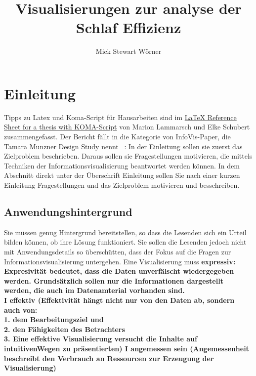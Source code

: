\documentclass[usegeometry=true]{scrartcl}
\begin{document}
\subject{Projektbericht zum Modul Information Retrieval und Visualisierung Sommersemester 2023}
\title{Visualisierungen zur analyse der Schlaf Effizienz}
\author{Mick Stewart Wörner}%
\maketitle%

\section{Einleitung}
Tipps zu Latex und Koma-Script für Hausarbeiten sind im \href{http://mirrors.ctan.org/info/latex-refsheet/LaTeX_RefSheet.pdf}{LaTeX Reference Sheet for a thesis with KOMA-Script} von Marion Lammarsch und Elke Schubert zusammengefasst. 
Der Bericht fällt in die Kategorie von InfoVis-Paper, die Tamara Munzner Design Study nennt ~\cite{Munzner2008}: In der Einleitung sollen sie zuerst das Zielproblem beschrieben. Daraus sollen sie Fragestellungen motivieren, die mittels Techniken der Informationsvisualisierung beantwortet werden können. In dem Abschnitt direkt unter der Überschrift Einleitung sollen Sie nach einer kurzen Einleitung Fragestellungen und das Zielproblem motivieren und besschreiben. 

\subsection{Anwendungshintergrund}
Sie müssen genug Hintergrund bereitstellen, so dass die Lesenden sich ein Urteil bilden können, ob ihre Lösung funktioniert. 
Sie sollen die Lesenden jedoch nicht mit Anwendungsdetails so überschütten, dass der Fokus auf die Fragen zur Informationsvisualisierung untergehen. 
Eine Visualisierung muss 
\textbf{expressiv: Expresivität bedeutet, dass die Daten unverfälscht wiedergegeben werden. Grundsätzlich sollen nur die Informationen dargestellt werden, die auch im Datenamterial vorhanden sind.\\
I effektiv (Effektivität hängt nicht nur von den Daten ab, sondern auch von:\\ 1. dem Bearbeitungsziel und \\2. den Fähigkeiten des Betrachters \\
3. Eine effektive Visualisierung versucht die Inhalte auf intuitivenWegen zu präsentierten)
I angemessen sein (Angemessenheit beschreibt den Verbrauch an Ressourcen zur Erzeugung der Visualisierung)}
\end{document}
